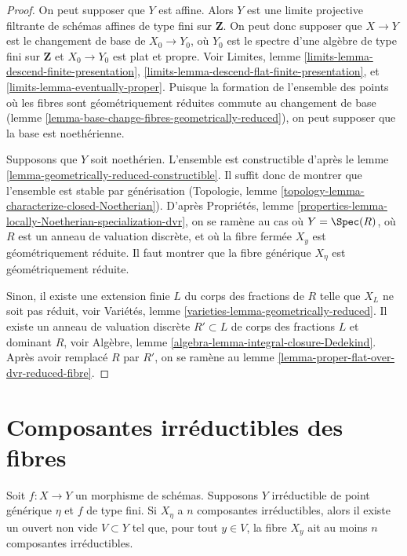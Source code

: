 \begin{proof}
On peut supposer que $Y$ est affine. Alors $Y$ est une limite projective filtrante
de schémas affines de type fini sur $\mathbf{Z}$.
On peut donc supposer que $X \to Y$ est le
changement de base de $X_0 \to Y_0$, où $Y_0$ est le spectre d'une algèbre de type
fini sur $\mathbf{Z}$ et $X_0 \to Y_0$ est plat et propre.
Voir Limites, lemme \ref{limits-lemma-descend-finite-presentation},
\ref{limits-lemma-descend-flat-finite-presentation}, et
\ref{limits-lemma-eventually-proper}. Puisque la formation de
l'ensemble des points où les fibres sont géométriquement
réduites commute au changement de base
(lemme \ref{lemma-base-change-fibres-geometrically-reduced}),
on peut supposer que la base est noethérienne.

\medskip\noindent
Supposons que $Y$ soit noethérien. L'ensemble est constructible d'après le
lemme \ref{lemma-geometrically-reduced-constructible}.
Il suffit donc de montrer que l'ensemble est stable par générisation
(Topologie, lemme \ref{topology-lemma-characterize-closed-Noetherian}). D'après
Propriétés, lemme \ref{properties-lemma-locally-Noetherian-specialization-dvr},
on se ramène au cas où $Y = \Spec(R)$, où $R$ est un anneau de
valuation discrète, et où la fibre fermée $X_y$ est géométriquement
réduite. Il faut montrer que la fibre générique $X_\eta$ est géométriquement réduite.

\medskip\noindent
Sinon, il existe une extension finie $L$ du corps des fractions
de $R$ telle que $X_L$ ne soit pas réduit, voir
Variétés, lemme \ref{varieties-lemma-geometrically-reduced}.
Il existe un anneau de valuation discrète
$R' \subset L$ de corps des fractions $L$ et dominant $R$, voir
Algèbre, lemme \ref{algebra-lemma-integral-closure-Dedekind}.
Après avoir remplacé $R$ par $R'$, on se ramène au
lemme \ref{lemma-proper-flat-over-dvr-reduced-fibre}.
\end{proof}

\section{Composantes irréductibles des fibres}
\label{section-irreducible}

\begin{lemma}
\label{lemma-irreducible-components-in-neighbourhood}
Soit $f : X \to Y$ un morphisme de schémas. Supposons $Y$ irréductible de
point générique $\eta$ et $f$ de type fini. Si $X_\eta$ a $n$
composantes irréductibles, alors il existe un ouvert non vide $V \subset Y$
tel que, pour tout $y \in V$, la fibre $X_y$ ait au moins $n$
composantes irréductibles.
\end{lemma}

